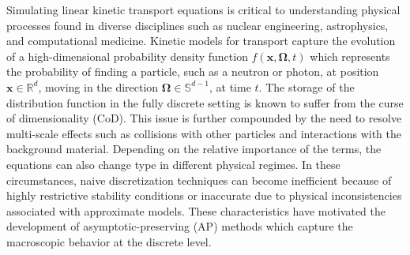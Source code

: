 \documentclass[onefignum,onetabnum]{siamart220329}
\begin{document}
Simulating linear kinetic transport equations is critical to understanding physical processes found in diverse disciplines such as nuclear engineering, astrophysics, and computational medicine. Kinetic models for transport capture the evolution of a high-dimensional probability density function $f \left(\mathbf{x}, \mathbf{\Omega}, t \right)$ which represents the probability of finding a particle, such as a neutron or photon, at position $\mathbf{x} \in \mathbb{R}^{d}$, moving in the direction $\mathbf{\Omega} \in \mathbb{S}^{d-1}$, at time $t$. The storage of the distribution function in the fully discrete setting is known to suffer from the curse of dimensionality (CoD). This issue is further compounded by the need to resolve multi-scale effects such as collisions with other particles and interactions with the background material. Depending on the relative importance of the terms, the equations can also change type in different physical regimes. In these circumstances, naive discretization techniques can become inefficient because of highly restrictive stability conditions or inaccurate due to physical inconsistencies associated with approximate models. These characteristics have motivated the development of asymptotic-preserving (AP) methods which capture the macroscopic behavior at the discrete level.
\end{document}

